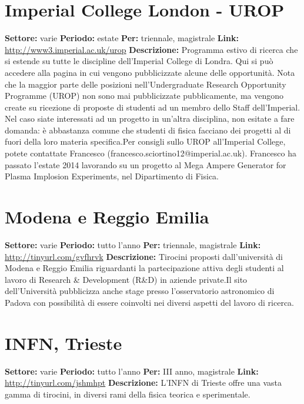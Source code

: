 \documentclass[a4paper,10pt]{article}
\begin{document}
\section{Imperial College London - UROP}
\textbf{Settore:} varie\newline
\textbf{Periodo:} estate\newline
\textbf{Per:} triennale, magistrale\newline
\textbf{Link:} \url{http://www3.imperial.ac.uk/urop} \newline
\textbf{Descrizione:}  Programma estivo di ricerca che si estende su tutte le discipline dell’Imperial College di Londra. Qui si può accedere alla pagina in cui vengono pubblicizzate alcune delle opportunità. Nota che la maggior parte delle posizioni nell'Undergraduate Research Opportunity Programme (UROP) non sono mai pubblicizzate pubblicamente, ma vengono create su ricezione di proposte di studenti ad un membro dello Staff dell'Imperial. Nel caso siate interessati ad un progetto in un’altra disciplina, non esitate a fare domanda: è abbastanza comune che studenti di fisica facciano dei progetti al di fuori della loro materia specifica.Per consigli sullo UROP all'Imperial College, potete contattate Francesco (francesco.sciortino12@imperial.ac.uk). Francesco ha passato l'estate 2014 lavorando su un progetto al Mega Ampere Generator for Plasma Implosion Experiments, nel Dipartimento di Fisica.   

\section{Modena e Reggio Emilia}
\textbf{Settore:} varie\newline
\textbf{Periodo:} tutto l'anno\newline
\textbf{Per:} triennale, magistrale\newline
\textbf{Link:} \url{http://tinyurl.com/gvfhrvk} \newline
\textbf{Descrizione:} Tirocini proposti dall’università di Modena e Reggio Emilia riguardanti la partecipazione attiva degli studenti al lavoro di Research \& Development (R\&D) in aziende private.Il sito dell’Università pubblicizza anche stage presso l’osservatorio astronomico di Padova con possibilità di essere coinvolti nei diversi aspetti del lavoro di ricerca.  

\section{INFN, Trieste} 
\textbf{Settore:} varie\newline
\textbf{Periodo:} tutto l'anno\newline
\textbf{Per:} III anno, magistrale\newline
\textbf{Link:} \url{http://tinyurl.com/jshmhpt} \newline
\textbf{Descrizione:} L’INFN di Trieste offre una vasta gamma di tirocini, in diversi rami della fisica teorica e sperimentale. 
\end{document}
